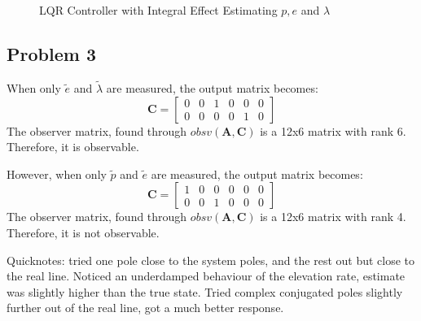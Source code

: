 \begin{figure}[p]
  \caption{LQR Controller with Integral Effect Estimating $p, e$ and $\lambda$}
  \label{fig:LQRIntegralEffect_Estimator}
\end{figure}
\restoregeometry

\subsection{Problem 3}

When only $\tilde{e}$ and $\tilde{\lambda}$ are measured, the output
matrix becomes:
%
\begin{equation*}
  \bm{C} =
  \begin{bmatrix}
    0 & 0 & 1 & 0 & 0 & 0 \\
    0 & 0 & 0 & 0 & 1 & 0
  \end{bmatrix}
\end{equation*}
%
The observer matrix, found through $obsv(\bm{A},\bm{C})$ is a 12x6
matrix with rank 6. Therefore, it is observable.

However, when only $\tilde{p}$ and $\tilde{e}$ are measured, the
output matrix becomes:
%
\begin{equation*}
  \bm{C} =
  \begin{bmatrix}
    1 & 0 & 0 & 0 & 0 & 0 \\
    0 & 0 & 1 & 0 & 0 & 0
  \end{bmatrix}
\end{equation*}
%
The observer matrix, found through $obsv(\bm{A},\bm{C})$ is a 12x6
matrix with rank 4. Therefore, it is not observable.

Quicknotes: tried one pole close to the system poles, and the rest out but close to the real line.
Noticed an underdamped behaviour of the elevation rate, estimate was slightly higher than the true state.
Tried complex conjugated poles slightly further out of the real line, got a much better response.

